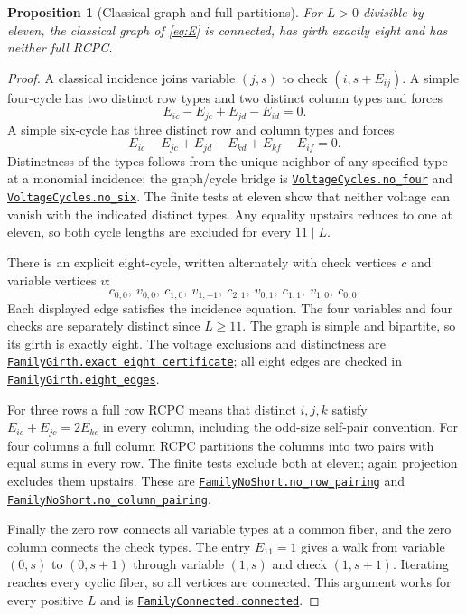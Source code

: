 \documentclass[11pt]{article}
\makeatletter
\newtheorem{proposition}[theorem]{Proposition}
\theoremstyle{definition}\newtheorem{definition}[theorem]{Definition}
\newcommand{\proofcommit}{98eb91cd9049e6a88887a5ba79150ad96a4a3e53}
\newcommand{\proofbase}{https://github.com/alectionary/vibe-math/blob/\proofcommit/formalization/distance-preservation}
\newcommand{\lean}[2]{\href{\proofbase/#1.lean\#L\csname leanline@#2\endcsname}{\nolinkurl{#2}}}
\makeatother
\begin{document}
\begin{proposition}[Classical graph and full partitions]\label{prop:graph}
For $L>0$ divisible by eleven, the classical graph of \eqref{eq:E}
is connected, has girth exactly eight and has neither full RCPC.
\end{proposition}
\begin{proof}
A classical incidence joins variable $(j,s)$ to check
$(i,s+E_{ij})$. A simple four-cycle has two distinct row types
and two distinct column types and forces
\[
 E_{ic}-E_{jc}+E_{jd}-E_{id}=0.
\]
A simple six-cycle has three distinct row and column types and forces
\[
 E_{ic}-E_{jc}+E_{jd}-E_{kd}+E_{kf}-E_{if}=0.
\]
Distinctness of the types follows from the unique neighbor of any
specified type at a monomial incidence; the graph/cycle bridge is
\lean{VoltageCycles}{VoltageCycles.no_four} and
\lean{VoltageCycles}{VoltageCycles.no_six}.
The finite tests at eleven show that neither voltage can vanish
with the indicated distinct types. Any equality upstairs reduces
to one at eleven, so both cycle lengths are excluded for every
$11\mid L$.

There is an explicit eight-cycle, written alternately with check
vertices $c$ and variable vertices $v$:
\[
 c_{0,0},\ v_{0,0},\ c_{1,0},\ v_{1,-1},\ c_{2,1},\ v_{0,1},\
 c_{1,1},\ v_{1,0},\ c_{0,0}.
\]
Each displayed edge satisfies the incidence equation. The four
variables and four checks are separately distinct since $L\geq11$.
The graph is simple and bipartite, so its girth is exactly eight.
The voltage exclusions and distinctness are
\lean{FamilyGirth}{FamilyGirth.exact_eight_certificate}; all eight
edges are checked in \lean{FamilyGirth}{FamilyGirth.eight_edges}.

For three rows a full row RCPC means that distinct $i,j,k$ satisfy
$E_{ic}+E_{jc}=2E_{kc}$ in every column, including the odd-size
self-pair convention. For four columns a full column RCPC partitions
the columns into two pairs with equal sums in every row. The finite
tests exclude both at eleven; again projection excludes them
upstairs. These are
\lean{FamilyNoShort}{FamilyNoShort.no_row_pairing} and
\lean{FamilyNoShort}{FamilyNoShort.no_column_pairing}.

Finally the zero row connects all variable types at a common fiber,
and the zero column connects the check types. The entry $E_{11}=1$
gives a walk from variable $(0,s)$ to $(0,s+1)$ through variable
$(1,s)$ and check $(1,s+1)$. Iterating reaches every cyclic fiber,
so all vertices are connected. This argument works for every
positive $L$ and is \lean{FamilyConnected}{FamilyConnected.connected}.
\end{proof}
\end{document}
